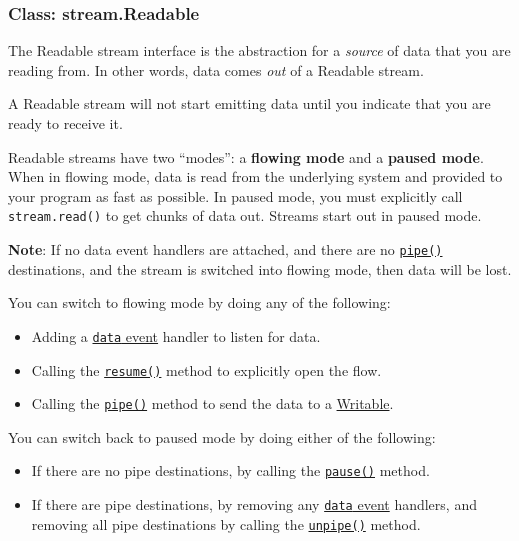 \subsubsection{Class: stream.Readable}\label{class-stream.readable}

The Readable stream interface is the abstraction for a \emph{source} of
data that you are reading from. In other words, data comes \emph{out} of
a Readable stream.

A Readable stream will not start emitting data until you indicate that
you are ready to receive it.

Readable streams have two ``modes'': a \textbf{flowing mode} and a
\textbf{paused mode}. When in flowing mode, data is read from the
underlying system and provided to your program as fast as possible. In
paused mode, you must explicitly call \texttt{stream.read()} to get
chunks of data out. Streams start out in paused mode.

\textbf{Note}: If no data event handlers are attached, and there are no
\hyperref[streamux5freadableux5fpipeux5fdestinationux5foptions]{\texttt{pipe()}}
destinations, and the stream is switched into flowing mode, then data
will be lost.

You can switch to flowing mode by doing any of the following:

\begin{itemize}
\itemsep1pt\parskip0pt
\item
  Adding a
  \hyperref[streamux5feventux5fdata]{\texttt{\textquotesingle{}data\textquotesingle{}}
  event} handler to listen for data.
\item
  Calling the \hyperref[streamux5freadableux5fresume]{\texttt{resume()}}
  method to explicitly open the flow.
\item
  Calling the
  \hyperref[streamux5freadableux5fpipeux5fdestinationux5foptions]{\texttt{pipe()}}
  method to send the data to a
  \hyperref[streamux5fclassux5fstreamux5fwritable]{Writable}.
\end{itemize}

You can switch back to paused mode by doing either of the following:

\begin{itemize}
\itemsep1pt\parskip0pt
\item
  If there are no pipe destinations, by calling the
  \hyperref[streamux5freadableux5fpause]{\texttt{pause()}} method.
\item
  If there are pipe destinations, by removing any
  \hyperref[streamux5feventux5fdata]{\texttt{\textquotesingle{}data\textquotesingle{}}
  event} handlers, and removing all pipe destinations by calling the
  \hyperref[streamux5freadableux5funpipeux5fdestination]{\texttt{unpipe()}}
  method.
\end{itemize}


